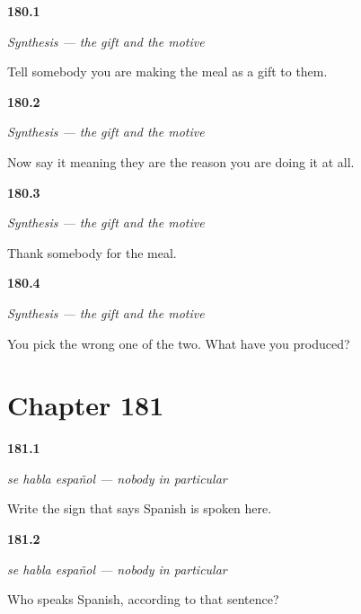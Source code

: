 \noindent\begin{minipage}[t]{\linewidth}
\raggedright
\hypertarget{review-ES-C51-sintesis-regalo-motivo-gift}{\textbf{180.1}} \emph{Synthesis — the gift and the motive}\par
\small Tell somebody you are making the meal as a gift to them.
\end{minipage}\par\medskip

\noindent\begin{minipage}[t]{\linewidth}
\raggedright
\hypertarget{review-ES-C51-sintesis-regalo-motivo-cause}{\textbf{180.2}} \emph{Synthesis — the gift and the motive}\par
\small Now say it meaning they are the reason you are doing it at all.
\end{minipage}\par\medskip

\noindent\begin{minipage}[t]{\linewidth}
\raggedright
\hypertarget{review-ES-C51-sintesis-regalo-motivo-thanks}{\textbf{180.3}} \emph{Synthesis — the gift and the motive}\par
\small Thank somebody for the meal.
\end{minipage}\par\medskip

\noindent\begin{minipage}[t]{\linewidth}
\raggedright
\hypertarget{review-ES-C51-sintesis-regalo-motivo-wrong}{\textbf{180.4}} \emph{Synthesis — the gift and the motive}\par
\small You pick the wrong one of the two. What have you produced?
\end{minipage}\par\medskip

\section*{Chapter 181}

\noindent\begin{minipage}[t]{\linewidth}
\raggedright
\hypertarget{review-ES-C52-se-habla-sign}{\textbf{181.1}} \emph{se habla español — nobody in particular}\par
\small Write the sign that says Spanish is spoken here.
\end{minipage}\par\medskip

\noindent\begin{minipage}[t]{\linewidth}
\raggedright
\hypertarget{review-ES-C52-se-habla-who}{\textbf{181.2}} \emph{se habla español — nobody in particular}\par
\small Who speaks Spanish, according to that sentence?
\end{minipage}\par\medskip

